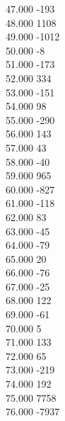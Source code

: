 { 47.000	-193 \\
 48.000	1108 \\
 49.000	-1012 \\
 50.000	-8 \\
 51.000	-173 \\
 52.000	334 \\
 53.000	-151 \\
 54.000	98 \\
 55.000	-290 \\
 56.000	143 \\
 57.000	43 \\
 58.000	-40 \\
 59.000	965 \\
 60.000	-827 \\
 61.000	-118 \\
 62.000	83 \\
 63.000	-45 \\
 64.000	-79 \\
 65.000	20 \\
 66.000	-76 \\
 67.000	-25 \\
 68.000	122 \\
 69.000	-61 \\
 70.000	5 \\
 71.000	133 \\
 72.000	65 \\
 73.000	-219 \\
 74.000	192 \\
 75.000	7758 \\
 76.000	-7937 \\
}
